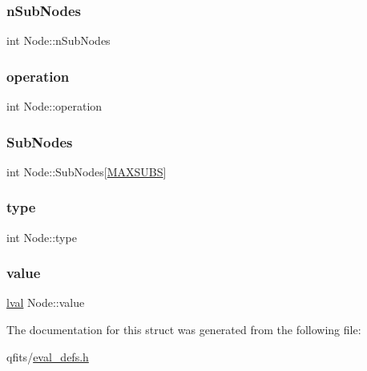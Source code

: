 \subsubsection{\texorpdfstring{n\+Sub\+Nodes}{nSubNodes}}
{\footnotesize\ttfamily int Node\+::n\+Sub\+Nodes}

\mbox{\label{struct_node_a80c597fa5c0fb320efdc06f06f18ec07}} 
\subsubsection{\texorpdfstring{operation}{operation}}
{\footnotesize\ttfamily int Node\+::operation}

\mbox{\label{struct_node_a88da4d42c58b4cf1679d2590199d4653}} 
\subsubsection{\texorpdfstring{Sub\+Nodes}{SubNodes}}
{\footnotesize\ttfamily int Node\+::\+Sub\+Nodes\mbox{[}\hyperlink{eval__defs_8h_a948bcf3a95aad00062f101ec770387f0}{M\+A\+X\+S\+U\+BS}\mbox{]}}

\mbox{\label{struct_node_a86fcc8384153457dcc9bcaf65c8fbec3}} 
\subsubsection{\texorpdfstring{type}{type}}
{\footnotesize\ttfamily int Node\+::type}

\mbox{\label{struct_node_afad6c2fba9562673ba72cf84fbb8b4c4}} 
\subsubsection{\texorpdfstring{value}{value}}
{\footnotesize\ttfamily \hyperlink{structlval}{lval} Node\+::value}



The documentation for this struct was generated from the following file\+:\begin{DoxyCompactItemize}
\item 
qfits/\hyperlink{eval__defs_8h}{eval\+\_\+defs.\+h}\end{DoxyCompactItemize}
